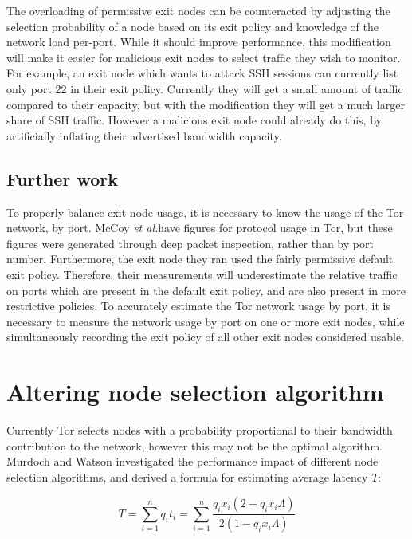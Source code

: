 \documentclass{article}
\makeatletter
\newcommand{\etal}{\textit{et al.\@\xspace}}
\makeatother
\begin{document}
The overloading of permissive exit nodes can be counteracted by adjusting the selection probability of a node based on its exit policy and knowledge of the network load per-port.
While it should improve performance, this modification will make it easier for malicious exit nodes to select traffic they wish to monitor.
For example, an exit node which wants to attack SSH sessions can currently list only port 22 in their exit policy.
Currently they will get a small amount of traffic compared to their capacity, but with the modification they will get a much larger share of SSH traffic.
However a malicious exit node could already do this, by artificially inflating their advertised bandwidth capacity.

\subsection{Further work}

To properly balance exit node usage, it is necessary to know the usage of the Tor network, by port.
McCoy \etal have figures for protocol usage in Tor, but these figures were generated through deep packet inspection, rather than by port number.
Furthermore, the exit node they ran used the fairly permissive default exit policy.
Therefore, their measurements will underestimate the relative traffic on ports which are present in the default exit policy, and are also present in more restrictive policies.
To accurately estimate the Tor network usage by port, it is necessary to measure the network usage by port on one or more exit nodes, while simultaneously recording the exit policy of all other exit nodes considered usable.

\section{Altering node selection algorithm}

Currently Tor selects nodes with a probability proportional to their bandwidth contribution to the network, however this may not be the optimal algorithm.
Murdoch and Watson investigated the performance impact of different node selection algorithms, and derived a formula for estimating average latency $T$:

\begin{equation}
T = \sum_{i=1}^n q_i t_i = \sum_{i=1}^n \frac{q_i x_i (2 - q_i x_i \Lambda)}{2 (1 - q_i x_i \Lambda)}
\label{eqn:waiting}
\end{equation}
\end{document}
